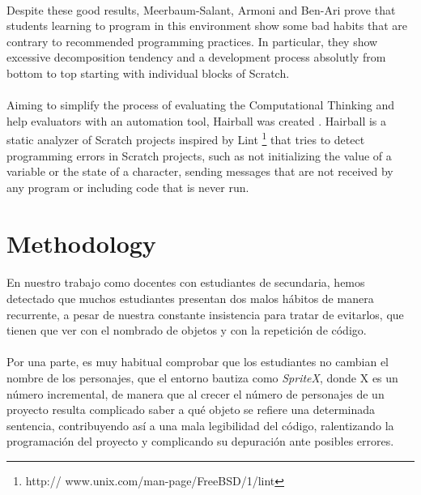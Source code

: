 \documentclass[a4paper,10pt]{article}
\begin{document}
\paragraph{}Despite these good results, Meerbaum-Salant, Armoni and Ben-Ari \cite{meerbaum2011habits} prove that students learning to program in this environment show some bad habits that are contrary to recommended programming practices. In particular, they show excessive decomposition tendency and a development process absolutly from bottom to top starting with individual blocks of Scratch.
\paragraph{} Aiming to simplify the process of evaluating the Computational Thinking and help evaluators with an automation tool, Hairball was created \cite{boe2013hairball}. Hairball is a static analyzer of Scratch projects inspired by Lint \footnote{http:// www.unix.com/man-page/FreeBSD/1/lint} that tries to detect programming errors in Scratch projects, such as not initializing the value of a variable or the state of a character, sending messages that are not received by any program or including code that is never run.

\section{Methodology}

\paragraph{}En nuestro trabajo como docentes con estudiantes de secundaria, hemos detectado que muchos estudiantes presentan dos malos hábitos de manera recurrente, a pesar de nuestra constante insistencia para tratar de evitarlos, que tienen que ver con el nombrado de objetos y con la repetición de código.

\paragraph{}Por una parte, es muy habitual comprobar que los estudiantes no cambian el nombre de los personajes, que el entorno bautiza como \textit{SpriteX}, donde X es un número incremental, de manera que al crecer el número de personajes de un proyecto resulta complicado saber a qué objeto se refiere una determinada sentencia, contribuyendo así a una mala legibilidad del código, ralentizando la programación del proyecto y complicando su depuración ante posibles errores.
\end{document}
